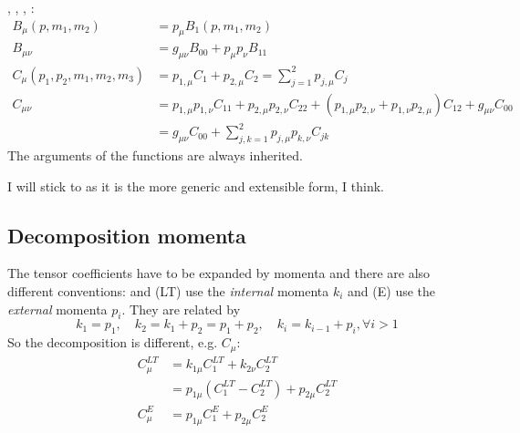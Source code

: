 \HEPMath, \FeynCalc, \LoopTools, \cite{Ellis:2011cr}:
\begin{align}
B_\mu(p,m_1,m_2) &=p_{\mu} B_1(p,m_1,m_2)\\
B_{\mu\nu} &= g_{\mu\nu}B_{00}+p_{\mu}p_{\nu} B_{11}\\
C_{\mu}(p_1,p_2,m_1,m_2,m_3) &= p_{1,\mu}C_{1}+p_{2,\mu}C_{2}=\sum_{j=1}^2 p_{j,\mu}C_{j}\\
C_{\mu\nu} &= p_{1,\mu}p_{1,\nu}C_{11}+p_{2,\mu}p_{2,\nu}C_{22}+(p_{1,\mu}p_{2,\nu}+p_{1,\nu}p_{2,\mu})C_{12}+g_{\mu\nu}C_{00}\\
 &=g_{\mu\nu}C_{00} + \sum_{j,k=1}^2 p_{j,\mu}p_{k,\nu}C_{jk}
\end{align}
The arguments of the functions are always inherited.

I will stick to \HEPMath{} as it is the more generic and extensible form, I think.

\subsection{Decomposition momenta}
The tensor coefficients have to be expanded by momenta and there are also different conventions: \HEPMath{} and \LoopTools{}(LT) use the \textit{internal} momenta $k_i$ and \cite{Passarino:1978jh,Bojak:2000eu,Ellis:2011cr}(E) use the \textit{external} momenta $p_i$. They are related by
\begin{equation}
k_1 = p_1, \quad k_2 = k_1+p_2=p_1+p_2, \quad k_i = k_{i-1}+p_i, \forall i>1
\end{equation}
So the decomposition is different, e.g. $C_{\mu}:$
\begin{align}
C_{\mu}^{LT} &= k_{1\mu}C_{1}^{LT}+k_{2\nu}C_{2}^{LT}\\
 &=p_{1\mu}(C_1^{LT}-C_2^{LT}) + p_{2\mu}C_2^{LT}\\
C_{\mu}^{E} &= p_{1\mu}C_{1}^{E}+p_{2\mu}C_{2}^{E}
\end{align}

